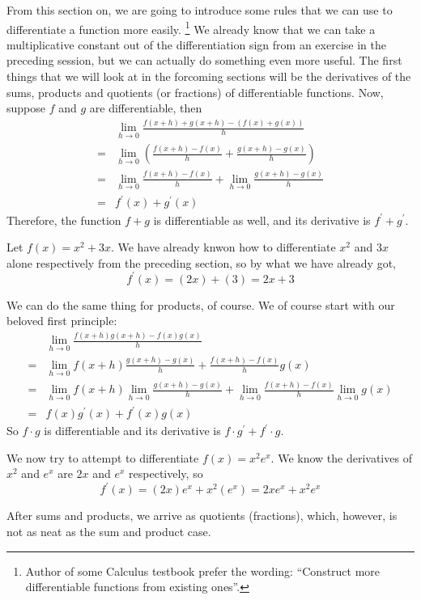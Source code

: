 From this section on, we are going to introduce some rules that we can use to differentiate a function more easily.
\footnote{Author of some Calculus testbook prefer the wording: ``Construct more differentiable functions from existing ones''.}
We already know that we can take a multiplicative constant out of the differentiation sign from an exercise in the preceding session, but we can actually do something even more useful.
The first things that we will look at in the forcoming sections will be the derivatives of the sums, products and quotients (or fractions) of differentiable functions.
Now, suppose $f$ and $g$ are differentiable, then
\begin{align*}
    &\lim_{h\to0}\frac{f(x+h)+g(x+h)-(f(x)+g(x))}{h}\\
    =&\lim_{h\to0}(\frac{f(x+h)-f(x)}{h}+\frac{g(x+h)-g(x)}{h})\\
    =&\lim_{h\to0}\frac{f(x+h)-f(x)}{h}+\lim_{h\to0}\frac{g(x+h)-g(x)}{h}\\
    =&f^\prime(x)+g^\prime(x)
\end{align*}
Therefore, the function $f+g$ is differentiable as well, and its derivative is $f^\prime+g^\prime$.
\begin{example}
    Let $f(x)=x^2+3x$. We have already knwon how to differentiate $x^2$ and $3x$ alone respectively from the preceding section, so by what we have already got,
    $$f^\prime(x)=(2x)+(3)=2x+3$$
\end{example}
We can do the same thing for products, of course. We of course start with our beloved first principle:
\begin{align*}
    &\lim_{h\to0}\frac{f(x+h)g(x+h)-f(x)g(x)}{h}\\
    =&\lim_{h\to0}f(x+h)\frac{g(x+h)-g(x)}{h}+\frac{f(x+h)-f(x)}{h}g(x)\\
    =&\lim_{h\to0}f(x+h)\lim_{h\to0}\frac{g(x+h)-g(x)}{h}+\lim_{h\to0}\frac{f(x+h)-f(x)}{h}\lim_{h\to0}g(x)\\
    =&f(x)g^\prime(x)+f^\prime(x)g(x)
\end{align*}
So $f\cdot g$ is differentiable and its derivative is $f\cdot g^\prime+f^\prime\cdot g$.
\begin{example}
    We now try to attempt to differentiate $f(x)=x^2e^x$. We know the derivatives of $x^2$ and $e^x$ are $2x$ and $e^x$ respectively, so
    $$f^\prime(x)=(2x)e^x+x^2(e^x)=2xe^x+x^2e^x$$
\end{example}
After sums and products, we arrive as quotients (fractions), which, however, is not as neat as the sum and product case.
